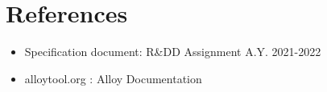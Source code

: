 \documentclass{article}
\begin{document}
\section{References}
\begin{itemize}
      \item Specification document: R\&DD Assignment A.Y. 2021-2022
      \item alloytool.org : Alloy Documentation
\end{itemize}
\end{document}
